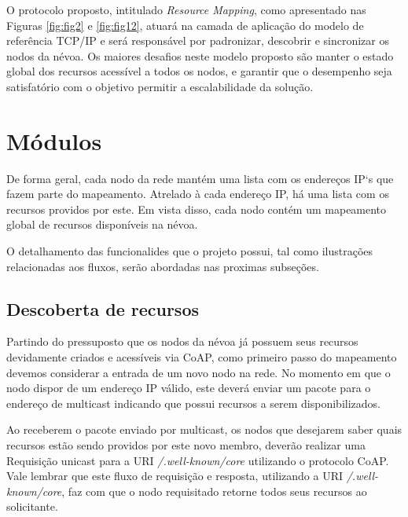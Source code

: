 O protocolo proposto, intitulado \textit{Resource Mapping}, como apresentado nas Figuras \ref{fig:fig2} e \ref{fig:fig12}, atuará na camada de aplicação do modelo de referência TCP/IP \cite{tanenbaum2011redes} e será responsável por padronizar, descobrir e sincronizar os nodos da névoa.
Os maiores desafios neste modelo proposto são manter o estado global dos recursos acessível a todos os nodos, e garantir que o desempenho seja satisfatório com o objetivo permitir a escalabilidade da solução.


\section{Módulos}

De forma geral, cada nodo da rede mantém uma lista com os endereços IP`s que fazem parte do mapeamento.
Atrelado à cada endereço IP,  há uma lista com os recursos providos por este.
Em vista disso, cada nodo contém um mapeamento global de recursos disponíveis na névoa.

O detalhamento das funcionalides que o projeto possui, tal como ilustrações relacionadas aos fluxos, serão abordadas nas proximas subseções.

\subsection{Descoberta de recursos}


Partindo do pressuposto que os nodos da névoa já possuem seus recursos devidamente criados e acessíveis via CoAP,
como primeiro passo do mapeamento devemos considerar a entrada de um novo nodo na rede.
No momento em que o nodo dispor de um endereço IP válido, este deverá enviar um pacote para o endereço de multicast indicando que possui recursos a serem disponibilizados.


Ao receberem o pacote enviado por multicast, os nodos que desejarem saber quais recursos estão sendo providos por este novo membro, deverão realizar uma Requisição
unicast para a URI \textit{/.well-known/core} utilizando o protocolo CoAP.
Vale lembrar que este fluxo de requisição e resposta, utilizando a URI \textit{/.well-known/core}, faz com que o nodo requisitado retorne todos seus recursos ao solicitante.


